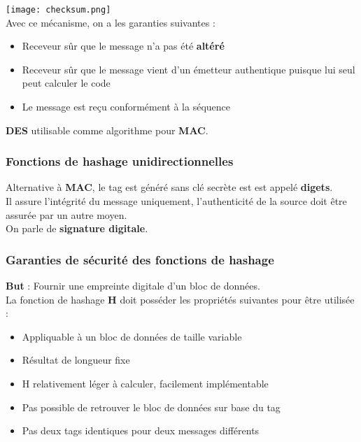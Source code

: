\documentclass{report}
\begin{document}
				\texttt{[image: checksum.png]}\\

				Avec ce mécanisme, on a les garanties suivantes : \\

				\begin{itemize}
					\item Receveur sûr que le message n'a pas été \textbf{altéré}
					\item Receveur sûr que le message vient d'un émetteur authentique puisque lui seul peut calculer le code
					\item Le message est reçu conformément à la séquence\\
				\end{itemize}

				\textbf{DES} utilisable comme algorithme pour \textbf{MAC}.\\

			\subsubsection{Fonctions de hashage unidirectionnelles}

				Alternative à \textbf{MAC}, le tag est généré sans clé secrète est est appelé \textbf{digets}.\\
				Il assure l'intégrité du message uniquement, l'authenticité de la source doit être assurée par un autre moyen.\\

				On parle de \textbf{signature digitale}.\\


			\subsubsection{Garanties de sécurité des fonctions de hashage}

				\textbf{But} : Fournir une empreinte digitale d'un bloc de données.\\
				La fonction de hashage \textbf{H} doit posséder les propriétés suivantes pour être utilisée : \\

				\begin{itemize}
					\item Appliquable à un bloc de données de taille variable
					\item Résultat de longueur fixe
					\item H relativement léger à calculer, facilement implémentable
					\item Pas possible de retrouver le bloc de données sur base du tag
					\item Pas deux tags identiques pour deux messages différents\\
				\end{itemize}
\end{document}
